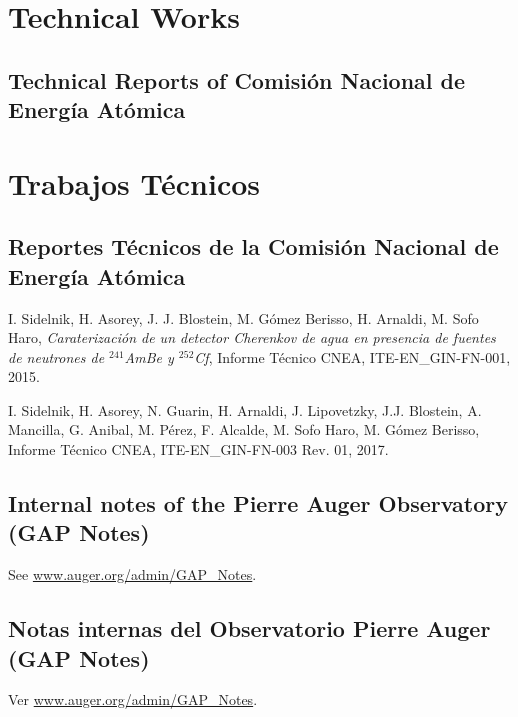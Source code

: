 \ifeng
\section*{Technical Works}
\subsection*{Technical Reports of Comisión Nacional de Energía Atómica}
\else
\section*{Trabajos Técnicos}
\subsection*{Reportes Técnicos de la Comisión Nacional de Energía Atómica}
\fi

\noindent
\begin{etaremune}
\item {} I. Sidelnik, H. Asorey, J. J. Blostein, M. Gómez Berisso, H. Arnaldi, M. Sofo Haro, {\emph{Caraterización de un detector Cherenkov de agua en presencia de fuentes de neutrones de $^{241}$AmBe y $^{252}$Cf}}, Informe Técnico CNEA, ITE-EN\_GIN-FN-001, 2015.

\item {} I. Sidelnik, H. Asorey, N. Guarin, H. Arnaldi, J. Lipovetzky, J.J. Blostein, A. Mancilla, G. Anibal, M. Pérez, F. Alcalde, M. Sofo Haro, M. Gómez Berisso, Informe Técnico CNEA, ITE-EN\_GIN-FN-003 Rev. 01, 2017.

\end{etaremune}

\ifeng
\subsection*{Internal notes of the Pierre Auger Observatory (GAP Notes)}

See \href{http://www.auger.org/admin-cgi-bin/woda/gap\_notes.pl/Search?search=asorey}{www.auger.org/admin/GAP\_Notes}.
\else
\subsection*{Notas internas del Observatorio Pierre Auger (GAP Notes)}

Ver \href{http://www.auger.org/admin-cgi-bin/woda/gap\_notes.pl/Search?search=asorey}{www.auger.org/admin/GAP\_Notes}.
\fi

